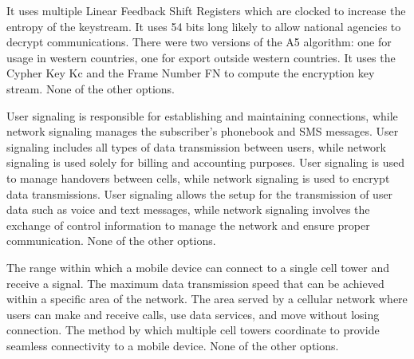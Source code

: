 \begin{checkboxes}
    \CorrectChoice It uses multiple Linear Feedback Shift Registers which are clocked to increase the entropy of the keystream.
    \CorrectChoice It uses 54 bits long likely to allow national agencies to decrypt communications.
    \CorrectChoice There were two versions of the A5 algorithm: one for usage in western countries, one for export outside western countries.
    \CorrectChoice It uses the Cypher Key Kc and the Frame Number FN to compute the encryption key stream.
    \choice None of the other options.
\end{checkboxes}

\begin{checkboxes}
    \choice User signaling is responsible for establishing and maintaining connections, while network signaling manages the subscriber's phonebook and SMS messages.
    \choice User signaling includes all types of data transmission between users, while network signaling is used solely for billing and accounting purposes.
    \choice User signaling is used to manage handovers between cells, while network signaling is used to encrypt data transmissions.
    \CorrectChoice User signaling allows the setup for the transmission of user data such as voice and text messages, while network signaling involves the exchange of control information to manage the network and ensure proper communication.
    \choice None of the other options.
\end{checkboxes}

\begin{checkboxes}
    \choice The range within which a mobile device can connect to a single cell tower and receive a signal.
    \choice The maximum data transmission speed that can be achieved within a specific area of the network.
    \CorrectChoice The area served by a cellular network where users can make and receive calls, use data services, and move without losing connection.
    \choice The method by which multiple cell towers coordinate to provide seamless connectivity to a mobile device.
    \choice None of the other options.
\end{checkboxes}
